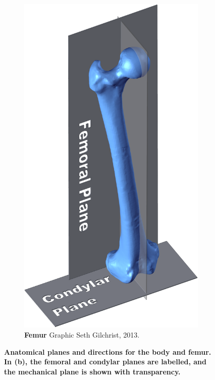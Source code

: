 \begin{figure}
\begin{subfigure}{0.36725\linewidth}
	\includegraphics[width=\linewidth]{./intro/Figures/FemoralPlanes}
	\caption{\textbf{Femur} Graphic \textcopyright Seth Gilchrist, 2013.}
	\label{fig:Planes_femur}
\end{subfigure}
\caption[Anatomical and femoral geometrical references]{\textbf{Anatomical planes and directions for the body and femur. In (b), the femoral and condylar planes are labelled, and the mechanical plane is shown with transparency.} }
\label{fig:Planes}
\end{figure}

